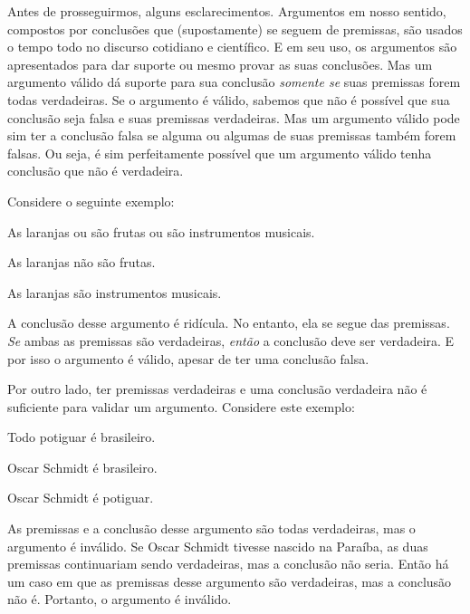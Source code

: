 Antes de prosseguirmos, alguns esclarecimentos.
Argumentos em nosso sentido, compostos por conclusões que (supostamente) se seguem de premissas, são usados o tempo todo no discurso cotidiano e científico.
E em seu uso, os argumentos são apresentados para dar suporte ou mesmo provar as suas conclusões.
Mas um argumento válido dá suporte para sua conclusão \emph{somente se} suas premissas forem todas verdadeiras.
Se o argumento é válido, sabemos que não é possível que sua conclusão seja falsa e suas premissas verdadeiras.
Mas um argumento válido pode sim ter a conclusão falsa se alguma ou algumas de suas premissas também forem falsas.
Ou seja, é sim perfeitamente possível que um argumento válido tenha conclusão que não é verdadeira.

Considere o seguinte exemplo:
	\begin{earg}
		\item[] As laranjas ou são frutas ou são instrumentos musicais.
		\item[] As laranjas não são frutas.
		\item[\therefore] As laranjas são instrumentos musicais.
	\end{earg}
A conclusão desse argumento é ridícula. No entanto, ela se segue das premissas. \emph{Se} ambas as premissas são verdadeiras, \emph{então} a conclusão deve ser verdadeira. E por isso o argumento é válido, apesar de ter uma conclusão falsa.

Por outro lado, ter premissas verdadeiras e uma conclusão verdadeira não é suficiente para validar um argumento. Considere este exemplo:
	\begin{earg}
		\item[] Todo potiguar é brasileiro.
		\item[] Oscar Schmidt é brasileiro.
		\item[\therefore] Oscar Schmidt é potiguar.
	\end{earg}
As premissas e a conclusão desse argumento são todas verdadeiras, mas o argumento é inválido.
Se Oscar Schmidt tivesse nascido na Paraíba, as duas premissas continuariam sendo verdadeiras, mas a conclusão não seria.
Então há um caso em que as premissas desse argumento são verdadeiras, mas a conclusão não é.
Portanto, o argumento é inválido.

